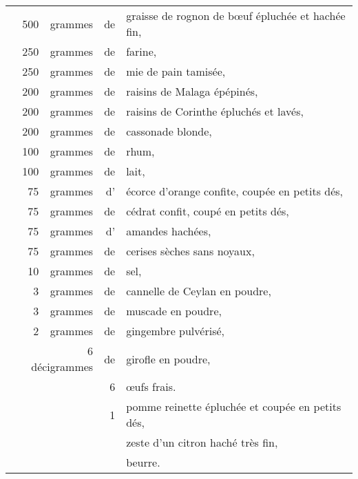 \footnotesize
\begin{longtable}{rrrrp{16em}}
  &     500 & grammes & de & graisse de rognon de bœuf épluchée et hachée fin,                            \\
  &     250 & grammes & de & farine,                                                                      \\
  &     250 & grammes & de & mie de pain tamisée,                                                         \\
  &     200 & grammes & de & raisins de Malaga épépinés,                                                  \\
  &     200 & grammes & de & raisins de Corinthe épluchés et lavés,                                       \\
  &     200 & grammes & de & cassonade blonde,                                                            \\
  &     100 & grammes & de & rhum,                                                                        \\
  &     100 & grammes & de & lait,                                                                        \\
  &      75 & grammes & d' & écorce d'orange confite, coupée en petits dés,                               \\
  &      75 & grammes & de & cédrat confit, coupé en petits dés,                                          \\
  &      75 & grammes & d' & amandes hachées,                                                             \\
  &      75 & grammes & de & cerises sèches sans noyaux,                                                  \\
  &      10 & grammes & de & sel,                                                                         \\
  &       3 & grammes & de & cannelle de Ceylan en poudre,                                                \\
  &       3 & grammes & de & muscade en poudre,                                                           \\
  &       2 & grammes & de & gingembre pulvérisé,                                                         \\
  & \multicolumn{2}{r}{6 décigrammes} & de & girofle en poudre,                                           \\
  &         &         &  6 & œufs frais.                                                                  \\
  &         &         &  1 & pomme reinette épluchée et coupée en petits dés,                             \\
  &         &         &    & zeste d'un citron haché très fin,                                            \\
  &         &         &    & beurre.                                                                      \\
\end{longtable}
\normalsize

